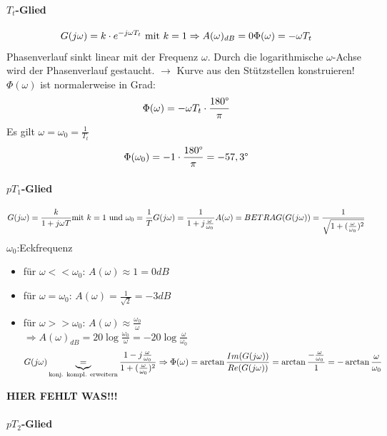 \documentclass[12pt,a4paper,ngerman]{scrartcl}
\begin{document}
\paragraph{$T_t$-Glied}

\[
G(j\omega)=k\cdot e^{-j\omega T_t} \text{ mit }k=1\\
\Rightarrow A(\omega)_{dB}=0\\
\Phi(\omega)=-\omega T_t
\]
Phasenverlauf sinkt linear mit der Frequenz $\omega$. Durch die logarithmische $\omega$-Achse wird der Phasenverlauf gestaucht. $\rightarrow$ Kurve aus den Stützstellen konstruieren! \\
$\Phi(\omega)$ ist normalerweise in Grad:
\[
\Phi(\omega)=-\omega T_t\cdot \frac{180\degree}{\pi}
\]
Es gilt $\omega = \omega_0 =\frac{1}{T_t}$
\[
\Phi(\omega_0)=-1\cdot \frac{180\degree}{\pi}=-57,3\degree
\]

\paragraph{$pT_1$-Glied}

\[
G(j\omega)=\frac{k}{1+j\omega T}\\
\text{mit } k=1 \text{ und } \omega_0=\frac{1}{T}\\
G(j\omega)=\frac{1}{1+j\frac{\omega}{\omega_0}}\\
A(\omega)=BETRAG(G(j\omega))=\frac{1}{\sqrt{1+(\frac{\omega}{\omega_0})^2}}
\]
$\omega_0$:Eckfrequenz
\begin{itemize}
\item für $\omega << \omega_0$: $A(\omega)\approx 1 =0dB$
\item für $\omega=\omega_0$: $A(\omega)=\frac{1}{\sqrt{2}}= -3dB$
\item für $\omega >>\omega_0$: $A(\omega)\approx \frac{\omega_0}{\omega}$\\
  $\Rightarrow A(\omega)_{dB}=20\log{\frac{\omega_0}{\omega}}=-20\log{\frac{\omega}{\omega_0}}$
\[
G(j\omega)\underbrace{=}_{\text{konj. kompl. erweitern}} \frac{1-j\frac{\omega}{\omega_0}}{1+(\frac{\omega}{\omega_0})^2}\\
\Rightarrow \Phi(\omega)=\arctan{\frac{Im(G(j\omega))}{Re(G(j\omega))}}\\
 =\arctan{\frac{-\frac{\omega}{\omega_0}}{1}}=-\arctan{\frac{\omega}{\omega_0}}
\]
\end{itemize}
\textbf{HIER FEHLT WAS!!!}

\paragraph{$pT_2$-Glied}
\end{document}
